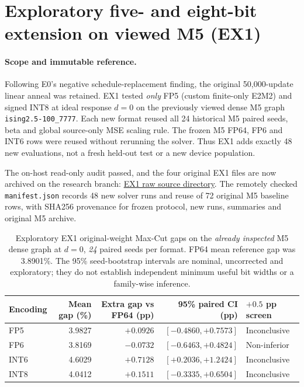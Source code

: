 \section{Exploratory five- and eight-bit extension on viewed M5 (EX1)}
\label{sec:ex1-m5-width}

\paragraph{Scope and immutable reference.}
Following E0's negative schedule-replacement finding,
the original 50,000-update linear anneal was retained.
EX1 tested \emph{only} FP5 (custom finite-only E2M2)
and signed INT8 at ideal response $d=0$ on the
previously viewed dense M5 graph
\texttt{ising2.5-100\_7777}. Each new format reused
all 24 historical M5 paired seeds, beta and
global source-only MSE scaling rule. The frozen
M5 FP64, FP6 and INT6 rows were reused
without rerunning the solver. Thus EX1 adds
exactly 48 new evaluations, not a fresh
held-out test or a new device population.

The on-host read-only audit passed, and the four
original EX1 files are now archived on the research
branch:
\href{https://github.com/Makise-okabe/MRAM_P-bit/tree/research/m4-gain-fusion-20261107/results/ex1_m5_fp5_int8_20261115}
{EX1 raw source directory}. The remotely checked
\texttt{manifest.json} records 48 new solver
runs and reuse of 72 original M5 baseline rows,
with SHA256 provenance for frozen protocol,
new runs, summaries and original M5 archive.

\begin{table}[htbp]\centering\small
\begin{tabular}{@{}l rrrl@{}}\toprule
Encoding & Mean gap (\%) & Extra gap vs FP64 (pp)
& 95\% paired CI (pp) & $+0.5$ pp screen\\\midrule
FP5 & 3.9827 & $+0.0926$ & $[-0.4860,+0.7573]$ & Inconclusive\\
FP6 & 3.8169 & $-0.0732$ & $[-0.6463,+0.4824]$ & Non-inferior\\
INT6 & 4.6029 & $+0.7128$ & $[+0.2036,+1.2424]$ & Inconclusive\\
INT8 & 4.0412 & $+0.1511$ & $[-0.3335,+0.6504]$ & Inconclusive\\\bottomrule
\end{tabular}
\caption{Exploratory EX1 original-weight Max-Cut gaps on
the \emph{already inspected} M5 dense graph at $d=0$,
\emph{24} paired seeds per format. FP64 mean
reference gap was 3.8901\%. The 95\% seed-bootstrap
intervals are nominal, uncorrected and exploratory;
they do not establish independent minimum useful
bit widths or a family-wise inference.}
\label{tab:ex1-quality}
\end{table}

